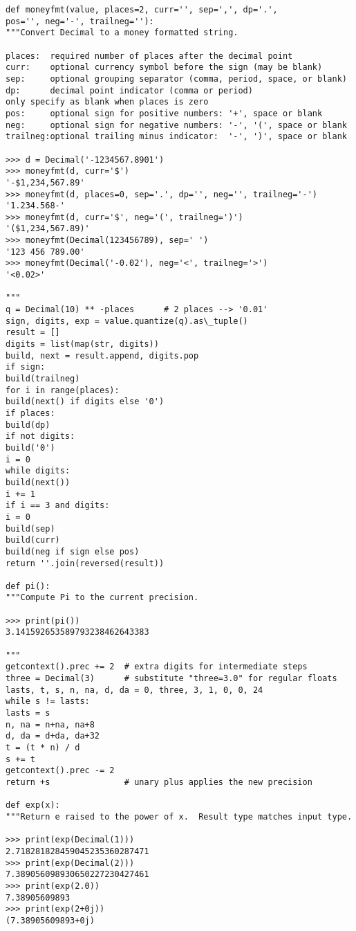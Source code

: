 \begin{lstlisting}
def moneyfmt(value, places=2, curr='', sep=',', dp='.',
pos='', neg='-', trailneg=''):
"""Convert Decimal to a money formatted string.

places:  required number of places after the decimal point
curr:    optional currency symbol before the sign (may be blank)
sep:     optional grouping separator (comma, period, space, or blank)
dp:      decimal point indicator (comma or period)
only specify as blank when places is zero
pos:     optional sign for positive numbers: '+', space or blank
neg:     optional sign for negative numbers: '-', '(', space or blank
trailneg:optional trailing minus indicator:  '-', ')', space or blank

>>> d = Decimal('-1234567.8901')
>>> moneyfmt(d, curr='$')
'-$1,234,567.89'
>>> moneyfmt(d, places=0, sep='.', dp='', neg='', trailneg='-')
'1.234.568-'
>>> moneyfmt(d, curr='$', neg='(', trailneg=')')
'($1,234,567.89)'
>>> moneyfmt(Decimal(123456789), sep=' ')
'123 456 789.00'
>>> moneyfmt(Decimal('-0.02'), neg='<', trailneg='>')
'<0.02>'

"""
q = Decimal(10) ** -places      # 2 places --> '0.01'
sign, digits, exp = value.quantize(q).as\_tuple()
result = []
digits = list(map(str, digits))
build, next = result.append, digits.pop
if sign:
build(trailneg)
for i in range(places):
build(next() if digits else '0')
if places:
build(dp)
if not digits:
build('0')
i = 0
while digits:
build(next())
i += 1
if i == 3 and digits:
i = 0
build(sep)
build(curr)
build(neg if sign else pos)
return ''.join(reversed(result))

def pi():
"""Compute Pi to the current precision.

>>> print(pi())
3.141592653589793238462643383

"""
getcontext().prec += 2  # extra digits for intermediate steps
three = Decimal(3)      # substitute "three=3.0" for regular floats
lasts, t, s, n, na, d, da = 0, three, 3, 1, 0, 0, 24
while s != lasts:
lasts = s
n, na = n+na, na+8
d, da = d+da, da+32
t = (t * n) / d
s += t
getcontext().prec -= 2
return +s               # unary plus applies the new precision

def exp(x):
"""Return e raised to the power of x.  Result type matches input type.

>>> print(exp(Decimal(1)))
2.718281828459045235360287471
>>> print(exp(Decimal(2)))
7.389056098930650227230427461
>>> print(exp(2.0))
7.38905609893
>>> print(exp(2+0j))
(7.38905609893+0j)


\end{lstlisting}
